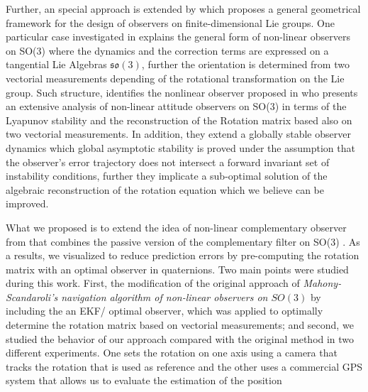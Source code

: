 \documentclass[10pt,conference]{IEEEtran}
\begin{document}
Further, an special approach is extended by \cite{Bonabel2008} which proposes a general geometrical framework for the design of observers on finite-dimensional Lie groups. One particular case investigated in \cite{Bonabel2008} explains the general form of non-linear observers on SO(3) where the dynamics and the correction terms are expressed on a tangential Lie Algebras $\mathfrak{so}(3)$, further the orientation is determined from two vectorial measurements depending of the rotational transformation on the Lie group. Such structure, identifies the nonlinear observer proposed in \cite{Mahony2008} who presents an extensive analysis of non-linear attitude observers on SO(3) in terms of the Lyapunov stability and the reconstruction of the Rotation matrix based also on two vectorial measurements. In addition, they extend a globally stable observer dynamics which global asymptotic stability is proved under the assumption that the observer's error trajectory does not intersect a forward invariant set of instability conditions, further they implicate a sub-optimal solution of the algebraic reconstruction of the rotation equation which we believe can be improved. \par 
What we proposed is to extend the idea of non-linear complementary observer from \cite{Scandaro2011} that combines the passive version of the complementary filter on SO(3) \cite{Mahony2008}. As a results, we visualized to reduce prediction errors by pre-computing the rotation matrix with an optimal observer in quaternions. Two main points were studied during this work. First, the modification of the original approach of \emph{Mahony-Scandaroli's navigation algorithm of non-linear observers on $SO(3)$} \cite{Mahony2008,Scandaro2011} by including the an EKF/ optimal observer, which was applied to optimally determine the rotation matrix based on vectorial measurements; and second, we studied the behavior of our approach compared with the original method in two different experiments. One sets the rotation on one axis using a camera that tracks the rotation that is used as reference and the other uses a commercial GPS system that allows us to evaluate the estimation of the position\par
\end{document}
